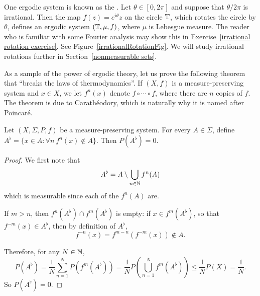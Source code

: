\begin{example}
\label{irrationalRotation}
One ergodic system is known as the .
Let $\theta \in [0, 2\pi]$ and suppose that $\theta/2\pi$ is irrational.
Then the map $f(z) = e^{i\theta}z$ on the circle $\mathbb{T}$, which rotates the circle by $\theta$, defines an ergodic system $(\mathbb{T}, \mu, f)$, where $\mu$ is Lebesgue measure.
The reader who is familiar with some Fourier analysis may show this in Exercise~\ref{irrational rotation exercise}.
See Figure~\ref{irrationalRotationFig}. We will study irrational rotations further in Section~\ref{nonmeasurable sets}.
\end{example}

\begin{subsec}
As a sample of the power of ergodic theory, let us prove the following theorem that ``breaks the laws of thermodynamics''.
If $(X, f)$ is a measure-preserving system and $x \in X$, we let $f^{n}(x)$ denote $f \circ \cdots \circ f$, where there are $n$ copies of $f$.
The theorem is due to Carathéodory, which is naturally why it is named after Poincar\'e.
\end{subsec}

\begin{theorem}
Let $(X, \Sigma, P, f)$ be a measure-preserving system.
For every $A \in \Sigma$, define $A^{\flat} = \{x \in A: \forall n~f^{n}(x) \notin A\}$.
Then $P(A^{\flat}) = 0$.
\end{theorem}
\begin{proof}
We first note that
\[A^{\flat} = A \setminus \bigcup_{n \in \mathbb{N}} f^{n}(A)\]
which is measurable since each of the $f^{n}(A)$ are.

If $m > n$, then $f^{n}(A^{\flat}) \cap f^{m}(A^{\flat})$ is empty: if $x \in f^{m}(A^{\flat})$, so that $f^{-m}(x) \in A^{\flat}$, then by definition of $A^{\flat}$,
\[f^{-n}(x) = f^{m-n}(f^{-m}(x)) \notin A.\]

Therefore, for any $N \in \mathbb{N}$,
\[P(A^{\flat}) = \frac{1}{N} \sum_{n=1}^{N} P(f^{m}(A^{\flat})) = \frac{1}{N} P\left(\bigcup_{n=1}^{N} f^{m}(A^{\flat})\right) \leq \frac{1}{N} P(X) = \frac{1}{N}.\]
So $P(A^{\flat}) = 0$.
\end{proof}

